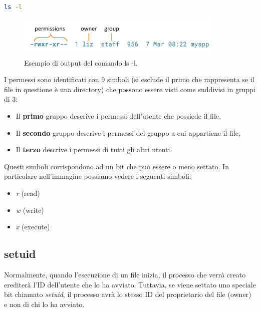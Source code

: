 \begin{lstlisting}[language=Bash]
    ls -l
\end{lstlisting}

\begin{figure}[H]
    \centering
    \includegraphics[width=10cm, keepaspectratio]{capitoli/os_security/imgs/permessi.png}
    \caption{Esempio di output del comando ls -l.}
\end{figure}

I permessi sono identificati con 9 simboli (si esclude il primo che rappresenta
se il file in questione è una directory) che possono essere visti come suddivisi
in gruppi di 3:

\begin{itemize}
    \item Il \textbf{primo} gruppo descrive i permessi dell'utente che possiede il file,
    \item Il \textbf{secondo} gruppo descrive i permessi del gruppo a cui appartiene il file,
    \item Il \textbf{terzo} descrive i permessi di tutti gli altri utenti.
\end{itemize}

Questi simboli corrispondono ad un bit che può essere o meno settato. In particolare
nell'immagine possiamo vedere i seguenti simboli:

\begin{itemize}
    \item \textit{r} (read)
    \item \textit{w} (write)
    \item \textit{x} (execute)
\end{itemize}

\subsection{setuid}

Normalmente, quando l'esecuzione di un file inizia, il processo che verrà creato
erediterà l'ID dell'utente che lo ha avviato. Tuttavia, se viene settato uno speciale
bit chiamato \textit{setuid}, il processo avrà lo stesso ID del proprietario
del file (owner) e non di chi lo ha avviato.\\

